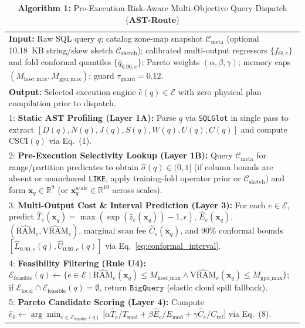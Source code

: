 \documentclass[10pt,a4paper]{article}
\newenvironment{fitasttable}{%
  \begin{lrbox}{\asttblbox}%
}{%
  \end{lrbox}%
  \sbox{\asttblboxB}{%
    \ifdim\wd\asttblbox>0.96\textwidth
      \resizebox{0.96\textwidth}{!}{\usebox{\asttblbox}}%
    \else
      \usebox{\asttblbox}%
    \fi
  }%
  \ifdim\ht\asttblboxB>0.72\textheight
    \resizebox{!}{0.72\textheight}{\usebox{\asttblboxB}}%
  \else
    \usebox{\asttblboxB}%
  \fi
}
\begin{document}
\begin{table}[!t]
\centering
\caption*{{\bf Algorithm 1:} Pre-Execution Risk-Aware Multi-Objective Query Dispatch (\textbf{AST-Route})}\label{alg:ast_route}
\footnotesize
\begin{fitasttable}
\begin{tabular}{@{}p{}@{}}
\toprule
\textbf{Input:} Raw SQL query $q$; catalog zone-map snapshot $\mathcal{C}_{\text{meta}}$ (optional 10.18~KB string/skew sketch $\mathcal{C}_{\text{sketch}}$); calibrated multi-output regressors $\{f_{\Theta,e}\}$ and fold conformal quantiles $\{\hat{q}_{0.90,e}\}$; Pareto weights $(\alpha,\beta,\gamma)$; memory caps $(M_{\text{host\_max}}, M_{\text{gpu\_max}})$; guard $\tau_{\text{guard}}=0.12$. \\
\textbf{Output:} Selected execution engine $\hat{e}(q) \in \mathcal{E}$ with zero physical plan compilation prior to dispatch. \\
\midrule
1: \textbf{Static AST Profiling (Layer 1A):} Parse $q$ via \texttt{SQLGlot} in single pass to extract $[D(q),N(q),J(q),S(q),W(q),U(q),C(q)]$ and compute $\text{CSCI}(q)$ via Eq.~(1). \\
2: \textbf{Pre-Execution Selectivity Lookup (Layer 1B):} Query $\mathcal{C}_{\text{meta}}$ for range/partition predicates to obtain $\hat{\sigma}(q) \in (0,1]$ (if column bounds are absent or unanchored \texttt{LIKE}, apply training-fold operator prior or $\mathcal{C}_{\text{sketch}}$) and form $\mathbf{x}_q \in \mathbb{R}^{9}$ (or $\mathbf{x}_q^{\text{scale}} \in \mathbb{R}^{10}$ across scales). \\
3: \textbf{Multi-Output Cost \& Interval Prediction (Layer 3):} For each $e \in \mathcal{E}$, predict $\hat{T}_e(\mathbf{x}_q) = \max(\exp(\hat{z}_e(\mathbf{x}_q))-1,\epsilon)$, $\hat{E}_e(\mathbf{x}_q)$, $(\widehat{\text{RAM}}_e, \widehat{\text{VRAM}}_e)$, marginal scan fee $\hat{C}_e(\mathbf{x}_q)$, and $90\%$ conformal bounds $[\hat{L}_{0.90,e}(q), \hat{U}_{0.90,e}(q)]$ via Eq.~\eqref{eq:conformal_interval}. \\
4: \textbf{Feasibility Filtering (Rule U4):} $\mathcal{E}_{\text{feasible}}(q) \leftarrow \{e \in \mathcal{E} \mid \widehat{\text{RAM}}_e(\mathbf{x}_q) \le M_{\text{host\_max}} \wedge \widehat{\text{VRAM}}_e(\mathbf{x}_q) \le M_{\text{gpu\_max}}\}$; if $\mathcal{E}_{\text{local}} \cap \mathcal{E}_{\text{feasible}}(q) = \emptyset$, return $\texttt{BigQuery}$ (elastic cloud spill fallback). \\
5: \textbf{Pareto Candidate Scoring (Layer 4):} Compute $\hat{e}_0 \leftarrow \arg\min_{e \in \mathcal{E}_{\text{feasible}}(q)} \big[\alpha \hat{T}_e/T_{\text{med}} + \beta \hat{E}_e/E_{\text{med}} + \gamma \hat{C}_e/C_{\text{ref}}\big]$ via Eq.~(8). \\

\end{tabular}
\end{fitasttable}
\end{table}
\end{document}
